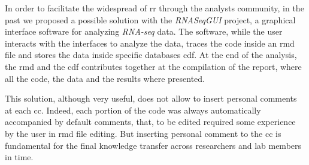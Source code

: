 In order to facilitate the widespread of \gls{rr} through the analysts community, in the past we proposed a possible solution with the \textit{RNASeqGUI} \cite{russo2015advantages} project, a graphical interface software for analyzing \textit{RNA-seq} data.
The software, while the user interacts with the interfaces to analyze the data, traces the code inside an \gls{rmd} file and stores the data inside specific databases \gls{cdf}.
At the end of the analysis, the \gls{rmd} and the \gls{cdf} contributes together at the compilation of the report, where all the code, the data and the results where presented.

This solution, although very useful, does not allow to insert personal comments at each \gls{cc}.
Indeed, each portion of the code was always automatically accompanied by default comments, that, to be edited required some experience by the user in \gls{rmd} file editing.
But inserting personal comment to the \gls{cc} is fundamental for the final knowledge transfer across researchers and lab members in time.


